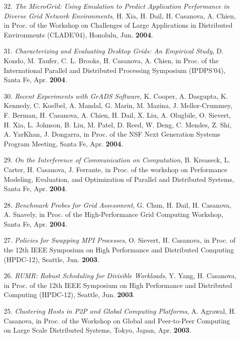 \begin{enumerate}
\item [32.]
{\it The MicroGrid: Using Emulation to Predict Application Performance
in Diverse Grid Network Environments}, H. Xia, H. Dail, H. Casanova,
A. Chien, in Proc. of the Workshop on Challenges of Large Applications
in Distributed Environments (CLADE'04), Honolulu, Jun. {\bf 2004}.

\item [31.]
{\it Characterizing and Evaluating Desktop Grids: An Empirical Study},
D. Kondo, M. Taufer, C. L. Brooks, H. Casanova, A. Chien, in Proc.
of the International Parallel and Distributed Processing Symposium
(IPDPS'04), Santa Fe, Apr. {\bf 2004}.

\item [30.]
{\it Recent Experiments with GrADS Software}, K. Cooper, A. Dasgupta,
K. Kennedy, C. Koelbel, A. Mandal, G. Marin, M. Mazina, J. Mellor-Crummey,
F. Berman, H. Casanova, A. Chien, H. Dail, X. Liu, A. Olugbile,
O. Sievert, H. Xia, L. Johnson, B. Liu, M. Patel, D. Reed, W. Deng,
C. Mendes, Z. Shi, A. YarKhan, J. Dongarra, in Proc. of the NSF
Next Generation Systems Program Meeting, Santa Fe, Apr. {\bf 2004}.

\item [29.]
{\it On the Interference of Communication on Computation}, B. Kreaseck,
L. Carter, H. Casanova, J. Ferrante, in Proc. of the workshop
on Performance Modeling, Evaluation, and Optimization of Parallel and
Distributed Systems, Santa Fe, Apr. {\bf 2004}.

\item [28.]
{\it Benchmark Probes for Grid Assessment}, G. Chun, H. Dail, H. Casanova,
A. Snavely, in Proc. of the High-Performance Grid Computing
Workshop, Santa Fe, Apr. {\bf 2004}.

\item [27.]
{\it Policies for Swapping MPI Processes}, O. Sievert, H. Casanova,
in Proc. of the 12th IEEE Symposium on High Performance and
Distributed Computing (HPDC-12), Seattle, Jun. {\bf 2003}.


\item [26.]
{\it RUMR: Robust Scheduling for Divisible Workloads}, Y. Yang,
H. Casanova, in Proc. of the 12th IEEE Symposium on High Performance
and Distributed Computing (HPDC-12), Seattle, Jun. {\bf 2003}.

\item [25.] 
{\it Clustering Hosts in P2P and Global Computing Platforms}, A. Agrawal,
H. Casanova, in Proc. of the Workshop on Global and Peer-to-Peer
Computing on Large Scale Distributed Systems, Tokyo, Japan, Apr.
{\bf 2003}.



\end{enumerate}
